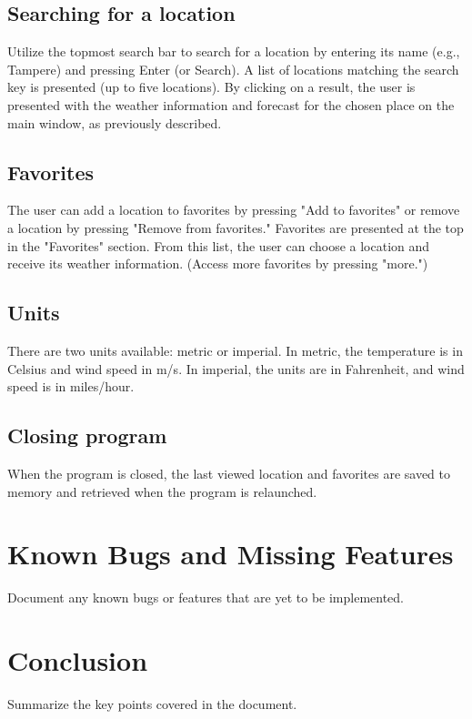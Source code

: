 \documentclass[a4paper,12pt]{article}
\begin{document}
\subsection{Searching for a location}

Utilize the topmost search bar to search for a location by entering its name (e.g., Tampere) and pressing Enter (or Search). A list of locations matching the search key is presented (up to five locations). By clicking on a result, the user is presented with the weather information and forecast for the chosen place on the main window, as previously described.

\subsection{Favorites}

The user can add a location to favorites by pressing "Add to favorites" or remove a location by pressing "Remove from favorites." Favorites are presented at the top in the "Favorites" section. From this list, the user can choose a location and receive its weather information. (Access more favorites by pressing "more.")

\subsection{Units}

There are two units available: metric or imperial. In metric, the temperature is in Celsius and wind speed in m/s. In imperial, the units are in Fahrenheit, and wind speed is in miles/hour.

\subsection{Closing program}

When the program is closed, the last viewed location and favorites are saved to memory and retrieved when the program is relaunched.


\section{Known Bugs and Missing Features}

Document any known bugs or features that are yet to be implemented.

\section{Conclusion}

Summarize the key points covered in the document.
\end{document}
